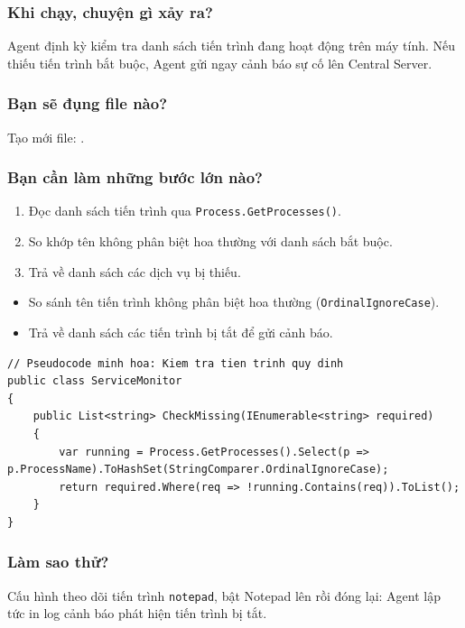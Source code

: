 \documentclass[12pt,a4paper]{article}
\begin{document}
\subsubsection{Khi chạy, chuyện gì xảy ra?}
Agent định kỳ kiểm tra danh sách tiến trình đang hoạt động trên máy tính. Nếu thiếu tiến trình bắt buộc, Agent gửi ngay cảnh báo sự cố lên Central Server.

\subsubsection{Bạn sẽ đụng file nào?}
Tạo mới file: .

\subsubsection{Bạn cần làm những bước lớn nào?}
\begin{enumerate}
  \item Đọc danh sách tiến trình qua \texttt{Process.GetProcesses()}.
  \item So khớp tên không phân biệt hoa thường với danh sách bắt buộc.
  \item Trả về danh sách các dịch vụ bị thiếu.
\end{enumerate}

\begin{orientationbox}
\begin{itemize}[leftmargin=1.5em, itemsep=1pt]
  \item So sánh tên tiến trình không phân biệt hoa thường (\texttt{OrdinalIgnoreCase}).
  \item Trả về danh sách các tiến trình bị tắt để gửi cảnh báo.
\end{itemize}
\end{orientationbox}

\begin{lstlisting}[language=CSharp, caption={Pseudocode minh họa: Kiểm tra phần mềm quy định có đang chạy không}]
// Pseudocode minh hoa: Kiem tra tien trinh quy dinh
public class ServiceMonitor
{
    public List<string> CheckMissing(IEnumerable<string> required)
    {
        var running = Process.GetProcesses().Select(p => p.ProcessName).ToHashSet(StringComparer.OrdinalIgnoreCase);
        return required.Where(req => !running.Contains(req)).ToList();
    }
}
\end{lstlisting}

\subsubsection{Làm sao thử?}
Cấu hình theo dõi tiến trình \texttt{notepad}, bật Notepad lên rồi đóng lại: Agent lập tức in log cảnh báo phát hiện tiến trình bị tắt.
\end{document}

